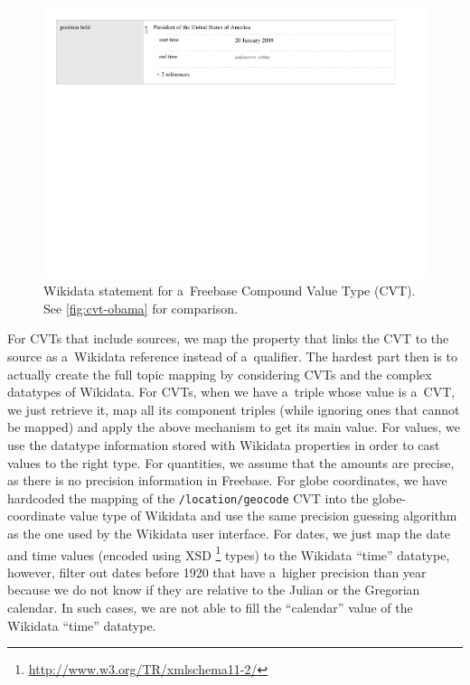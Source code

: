 \documentclass{acm_proc_article-sp}
\begin{document}
\begin{figure}[!htbp]
\centering
\includegraphics[width=1\columnwidth]{img/wikidata-statement-obama.pdf}
\caption{Wikidata statement for a~Freebase Compound Value Type (CVT).
  See \autoref{fig:cvt-obama} for comparison.}
\label{fig:statement-obama}
\end{figure}

For CVTs that include sources, we map the property that links the CVT
to the source as a~Wikidata reference instead of a~qualifier.
The hardest part then is to actually create the full topic mapping
by considering CVTs and the complex datatypes of Wikidata.
For CVTs, when we have a~triple whose value is a~CVT, we just retrieve it,
map all its component triples (while ignoring ones that cannot be mapped)
and apply the above mechanism to get its main value.
For values, we use the datatype information stored with Wikidata properties
in order to cast values to the right type.
For quantities, we assume that the amounts are precise,
as there is no precision information in Freebase.
For globe coordinates, we have hardcoded the mapping of the \texttt{/location/geocode} CVT
into the globe-coordinate value type of Wikidata
and use the same precision guessing algorithm as the one used by the Wikidata user interface.
For dates, we just map the date and time values (encoded using XSD%
\footnote{\url{ http://www.w3.org/TR/xmlschema11-2/}} types)
to the Wikidata ``time'' datatype, however, filter out dates before 1920 that have
a~higher precision than year because we do not know
if they are relative to the Julian or the Gregorian calendar.
In such cases, we are not able to fill the ``calendar'' value of the Wikidata ``time'' datatype.
\end{document}
